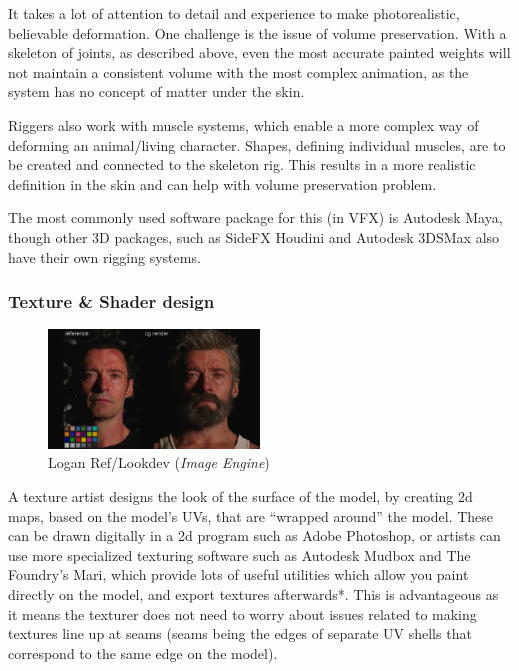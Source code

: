 It takes a lot of attention to detail and experience to make photorealistic, believable deformation. One challenge is the issue of volume preservation. With a skeleton of joints, as described above, even the most accurate painted weights will not maintain a consistent volume with the most complex animation, as the system has no concept of matter under the skin.

Riggers also work with muscle systems, which enable a more complex way of deforming an animal/living character. Shapes, defining individual muscles, are to be created and connected to the skeleton rig. This results in a more realistic definition in the skin and can help with volume preservation problem.

The most commonly used software package for this (in VFX) is Autodesk Maya, though other 3D packages, such as SideFX Houdini and Autodesk 3DSMax also have their own rigging systems.

\hypertarget{texture-shader-design}{%
\subsubsection{Texture \& Shader design}\label{texture-shader-design}}

\begin{figure}
\includegraphics[width=0.5\textwidth,height=\textheight]{./images/logan_lookdev.png}
\caption{Logan Ref/Lookdev (\emph{Image Engine})}
\end{figure}

A texture artist designs the look of the surface of the model, by creating 2d maps, based on the model's UVs, that are ``wrapped around'' the model. These can be drawn digitally in a 2d program such as Adobe Photoshop, or artists can use more specialized texturing software such as Autodesk Mudbox and The Foundry's Mari, which provide lots of useful utilities which allow you paint directly on the model, and export textures afterwards*. This is advantageous as it means the texturer does not need to worry about issues related to making textures line up at seams (seams being the edges of separate UV shells that correspond to the same edge on the model).

